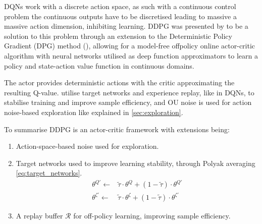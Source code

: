 DQNs work with a discrete action space, as such with a continuous control problem the continuous outputs have to be discretised leading to massive a massive action dimension, inhibiting learning. DDPG was presented by \cite{lillicrap2015continuous} to be a solution to this problem through an extension to the Deterministic Policy Gradient (DPG) method (\cite{silver2014deterministic}), allowing for a model-free offpolicy online actor-critic algorithm with neural networks utilised as deep function approximators to learn a policy and state-action value function in continuous domains.

The actor provides deterministic actions with the critic approximating the resulting Q-value. \cite{mnih2015human} utilise target networks and experience replay, like in DQNs, to stabilise training and improve sample efficiency, and OU noise is used for action noise-based exploration like explained in \autoref{sec:exploration}.

To summarise DDPG is an actor-critic framework with extensions being:
\begin{enumerate}
    \item Action-space-based noise used for exploration.
    \item Target networks used to improve learning stability, through Polyak averaging \autoref{eq:target_networks}.
\begin{equation}
\begin{aligned}
    \theta^{Q'} \leftarrow& \tilde{\tau} \cdot \theta^Q + (1 - \tilde{\tau}) \cdot \theta^{Q'}\\
    \theta^{\zeta'} \leftarrow& \tilde{\tau} \cdot \theta^\zeta + (1 - \tilde{\tau}) \cdot \theta^{\zeta'}
\end{aligned}
\label{eq:target_networks}
\end{equation}
    \item A replay buffer \(\mathcal{R}\) for off-policy learning, improving sample efficiency.
\end{enumerate}

